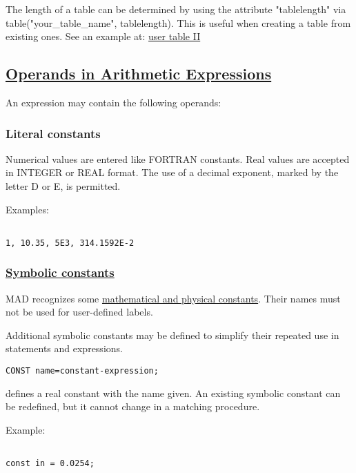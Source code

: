 The length of a table can be determined by using the attribute
"tablelength" via table("your\_table\_name", tablelength). This is
useful when creating a table from existing ones. See an example at:
\href{../Introduction/select.html#screate}{user table II} 


\subsection{\href{operand}{ Operands in Arithmetic Expressions}} 
An expression may contain the following operands:  

\subsubsection{Literal constants} 
Numerical values are entered like FORTRAN constants. Real values are
accepted in INTEGER or REAL format. The use of a decimal exponent,
marked by the letter D or E, is permitted.  

Examples: 
\begin{verbatim}

1, 10.35, 5E3, 314.1592E-2
\end{verbatim}

\subsubsection{\href{constant}{Symbolic constants}} 
MAD recognizes some \hyperlink{constant}{mathematical and physical
  constants}. Their names must not be used for user-defined labels.  

Additional symbolic constants may be defined to simplify their repeated
use in statements and expressions.  

\begin{verbatim}
CONST name=constant-expression;
\end{verbatim} 
defines a real constant with the name given. An existing symbolic constant can be redefined, but it cannot change in a matching procedure. 

Example: 
\begin{verbatim}

const in = 0.0254;
\end{verbatim}

